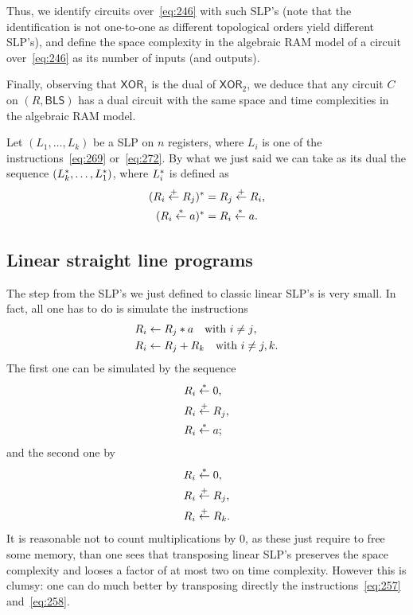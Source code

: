   Thus,
we identify circuits over~\ref{eq:246} with such SLP's (note that the
identification is not one-to-one as different topological orders yield
different SLP's), and define the space complexity in the algebraic RAM
model of a circuit over~\ref{eq:246} as its number of inputs (and
outputs).

Finally, observing that $\mathsf{XOR}_1$ is the dual of
$\mathsf{XOR}_2$, we deduce that any circuit $C$ on $(R,\mathsf{BLS})$
has a dual circuit with the same space and time complexities in the
algebraic RAM model.


\begin{remark}
  Let $(L_1,\ldots,L_k)$ be a SLP on $n$ registers, where $L_i$ is one
  of the instructions~\eqref{eq:269} or~\eqref{eq:272}. By what we
  just said we can take as its dual the sequence
  $(L_k^\ast,\ldots,L_1^\ast)$, where $L_i^\ast$ is defined as
  \begin{align}
    \label{eq:273}
    (R_i\overset{+}{\leftarrow}R_j)^\ast &= R_j\overset{+}{\leftarrow}R_i\text{,}\\
    (R_i\overset{*}{\leftarrow}a)^\ast &= R_i\overset{*}{\leftarrow}a\text{.}
  \end{align}
\end{remark}


\subsection{Linear straight line programs}
\label{sec:gener-stra-line}
The step from the SLP's we just defined to classic linear SLP's is
very small. In fact, all one has to do is simulate the instructions
\begin{align}
  \label{eq:257}
  R_i &\leftarrow R_j*a\quad\text{with $i\ne j$,}\\
  \label{eq:258}
  R_i &\leftarrow R_j + R_k\quad\text{with $i\ne j,k$.}
\end{align}
The first one can be simulated by the sequence
\begin{equation}
  \label{eq:259}
  \begin{aligned}
    R_i &\overset{*}{\leftarrow} 0\text{,}\\
    R_i &\overset{+}{\leftarrow} R_j\text{,}\\
    R_i &\overset{*}{\leftarrow} a\text{;}
  \end{aligned}
\end{equation}
and the second one by
\begin{equation}
  \label{eq:260}
  \begin{aligned}
    R_i &\overset{*}{\leftarrow} 0\text{,}\\
    R_i &\overset{+}{\leftarrow} R_j\text{,}\\
    R_i &\overset{+}{\leftarrow} R_k\text{.}
  \end{aligned}
\end{equation}
It is reasonable not to count multiplications by $0$, as these just
require to free some memory, than one sees that transposing linear
SLP's preserves the space complexity and looses a factor of at most
two on time complexity. However this is clumsy: one can do much better
by transposing directly the instructions~\eqref{eq:257}
and~\eqref{eq:258}.

